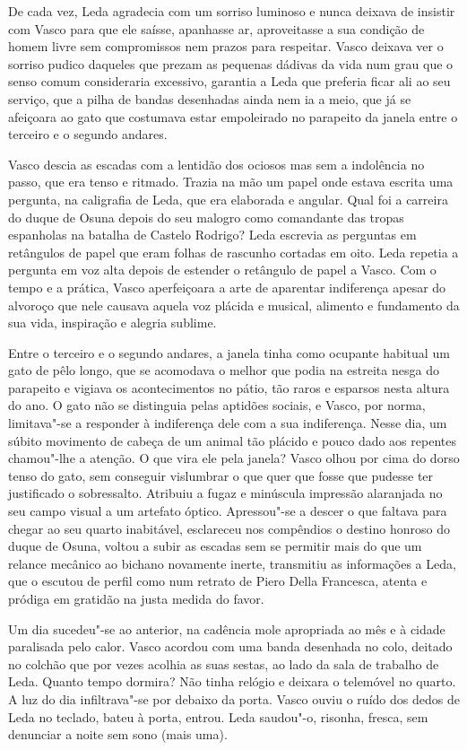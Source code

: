 De cada vez, Leda agradecia com um sorriso luminoso e nunca deixava de
insistir com Vasco para que ele saísse, apanhasse ar, aproveitasse a sua
condição de homem livre sem compromissos nem prazos para respeitar.
Vasco deixava ver o sorriso pudico daqueles que prezam as pequenas
dádivas da vida num grau que o senso comum consideraria excessivo, garantia a Leda que preferia ficar ali ao seu serviço, que a pilha de
bandas desenhadas ainda nem ia a meio, que já se afeiçoara ao gato que
costumava estar empoleirado no parapeito da janela entre o terceiro e o
segundo andares.

Vasco descia as escadas com a lentidão dos ociosos mas sem a indolência
no passo, que era tenso e ritmado. Trazia na mão um papel onde estava
escrita uma pergunta, na caligrafia de Leda, que era elaborada e
angular. Qual foi a carreira do duque de Osuna depois do seu malogro
como comandante das tropas espanholas na batalha de Castelo Rodrigo?
Leda escrevia as perguntas em retângulos de papel que eram folhas de
rascunho cortadas em oito. Leda repetia a pergunta em voz alta depois de
estender o retângulo de papel a Vasco.
Com o tempo e a prática, Vasco aperfeiçoara a arte de aparentar
indiferença apesar do alvoroço que nele causava aquela voz plácida e
musical, alimento e fundamento da sua vida, inspiração e alegria
sublime.

Entre o terceiro e o segundo andares, a janela tinha como ocupante
habitual um gato de pêlo longo, que se acomodava o melhor que podia na
estreita nesga do parapeito e vigiava os acontecimentos no pátio, tão
raros e esparsos nesta altura do ano. O gato não se distinguia pelas
aptidões sociais, e Vasco, por norma, limitava"-se a responder à
indiferença dele com a sua indiferença. Nesse dia, um súbito movimento
de cabeça de um animal tão plácido e pouco dado aos repentes chamou"-lhe a atenção. O que vira ele pela janela? Vasco olhou por cima do
dorso tenso do gato, sem conseguir vislumbrar o que quer que fosse que
pudesse ter justificado o sobressalto. Atribuiu a fugaz e minúscula
impressão alaranjada no seu campo visual a um artefato óptico.
Apressou"-se a descer o que faltava para chegar ao seu quarto inabitável,
esclareceu nos compêndios o destino honroso do duque de Osuna, voltou
a subir as escadas sem se permitir mais do que um relance mecânico ao
bichano novamente inerte, transmitiu as informações a Leda, que o
escutou de perfil como num retrato de Piero Della Francesca, atenta e
pródiga em gratidão na justa medida do favor.

Um dia sucedeu"-se ao anterior, na cadência mole apropriada ao mês e à
cidade paralisada pelo calor. Vasco acordou com uma banda desenhada no
colo, deitado no colchão que por vezes acolhia as suas sestas, ao lado
da sala de trabalho de Leda. Quanto tempo dormira? Não tinha relógio e
deixara o telemóvel no quarto. A luz do dia infiltrava"-se por debaixo da
porta. Vasco ouviu o ruído dos dedos de Leda no teclado,
bateu à porta, entrou. Leda saudou"-o, risonha, fresca, sem denunciar a
noite sem sono (mais uma).


